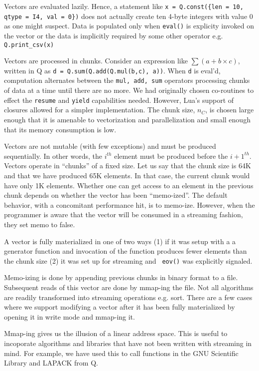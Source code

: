 Vectors are evaluated lazily. Hence, a statement like 
{\tt x = Q.const(\{len = 10, qtype = I4, val = 0\})} does not actually create
ten
4-byte integers with value 0 as one might suspect. Data is populated only when
{\tt eval()} is explicity invoked on the vector or the data is 
implicitly required by some other operator e.g. {\tt Q.print\_csv(x)}

Vectors are processed in chunks. Consider an expression  like \(\sum (a + b\times
c)\), written in Q as {\tt d = Q.sum(Q.add(Q.mul(b,c), a))}.
When {\tt d} is eval'd, computation alternates between the {\tt mul, add, sum}
operators
processing chunks of data at a time until there are
no more.
We had originally chosen co-routines to effect the {\tt resume} and
{\tt yield} capabilities needed. However, Lua's support of closures allowed for
a simpler implementation.
The chunk size, \(n_C\), is chosen large enough that it is amenable to
vectorization and parallelization and small enough that its memory consumption
is low.

Vectors are not mutable (with few exceptions)
and must be produced sequentially. In other words, the \(i^{th}\) element must
be produced before the \({i+1}^{th}\). Vectors
operate in ``chunks'' of a fixed size. Let us say that the chunk size is 64K and
that we have produced 65K elements. In that case, the current chunk would have
only 1K elements. Whether one can get access to an element in the previous chunk
depends on whether the vector has been ``memo-ized''. The default behavior, with
a concomitant performance hit, is to memo-ize. However, when the programmer is
aware that the vector will be consumed in a streaming fashion, they set memo
to false. 

A vector is fully materialized in one of two ways (1) if it was setup with a a generator function and invocation of the function produces 
fewer elements than the chunk size (2) it was set up for streaming and {\tt
eov()} was explicitly signaled.

Memo-izing is done by appending previous chunks in binary format to a file.
Subsequent reads of this vector are done by mmap-ing the file. Not all
algorithms are readily transformed into streaming operations e.g. sort. There
are a few cases where we support modifying a vector after it has been fully
materialized by opening it in write mode and mmap-ing it.

Mmap-ing gives us the illusion of a linear address space. This is useful to
incoporate algorithms and libraries that have not been written with streaming in
mind. For example, we have used this to call functions in the GNU Scientific
Library and LAPACK from Q.

